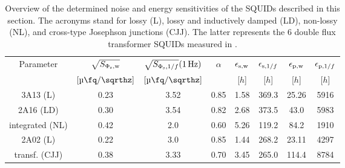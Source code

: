 
\begin{table}[t!]
	\centering
	\begin{tabular}{c|*{7}{c}}
	\toprule
		Parameter & $\sqrt{S_{\rm \Phi_{\rm s},w}}$ & $\sqrt{S_{\Phi_{\rm s},1/f}}(\qty{1}{\Hz})$ & $\alpha$ & $\epsilon_{\rm s,w}$ & $\epsilon_{{\rm s},1/f}$ & $\epsilon_{\rm p,w}$ & $\epsilon_{{\rm p},1/f}$ \\
		 & $[\unit[per-mode=symbol]{\micro\fq\per\sqrthz}]$ & $[\unit[per-mode=symbol]{\micro\fq\per\sqrthz}]$ &  & [$h$] & [$h$] & [$h$] & [$h$] \\
		\midrule
		3A13 (L) & 0.23 & 3.52 & 0.85 & 1.58 & 369.3 & 25.26 & 5916 \\
		2A16 (LD) & 0.30 & 3.54 & 0.82 & 2.68 & 373.5 & 43.0 & 5983 \\
		integrated (NL) & 0.42 & 2.0 & 0.60 & 5.26 & 119.2 & 84.2 & 1910 \\
		2A02 (L) & 0.22 & 3.0 & 0.85 & 1.44 & 268.2 & 23.11 & 4297 \\
		transf. (CJJ) & 0.38 & 3.33 & 0.70 & 3.45 & 265.0 & 114.4 & 8784 \\
	\end{tabular}
	\caption{Overview of the determined noise and energy sensitivities of the SQUIDs described in this section. The acronyms stand for lossy (L), lossy and inductively damped (LD), non-lossy (NL), and cross-type Josephson junctions (CJJ). The latter represents the \qty{6}{\nH} double flux transformer SQUIDs measured in \cite{Bauer2022}.}
	\label{tab:noise}
\end{table}

